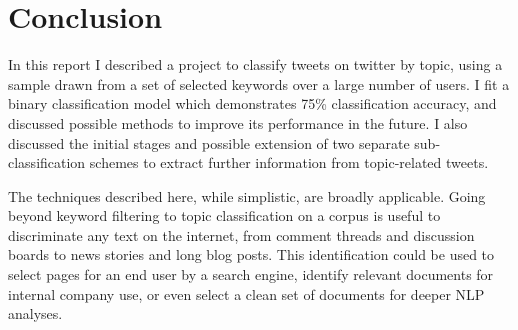\documentclass[11pt]{revtex4-1}
\begin{document}
\section{Conclusion}
\label{sec:conclusion}

In this report I described a project to classify tweets on twitter by
topic, using a sample drawn from a set of selected keywords over a
large number of users.  I fit a binary classification model which
demonstrates 75\% classification accuracy, and discussed possible
methods to improve its performance in the future.  I also discussed
the initial stages and possible extension of two separate
sub-classification schemes to extract further information from
topic-related tweets.

The techniques described here, while simplistic, are broadly
applicable.  Going beyond keyword filtering to topic classification on
a corpus is useful to discriminate any text on the internet, from
comment threads and discussion boards to news stories and long blog
posts.  This identification could be used to select pages for an end
user by a search engine, identify relevant documents for internal
company use, or even select a clean set of documents for deeper NLP
analyses.
\end{document}
